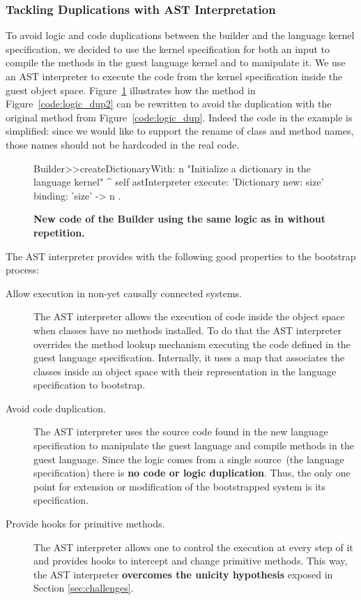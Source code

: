 \subsubsection{Tackling Duplications with AST Interpretation}\label{sec:ast_interpreter}

To avoid logic and code duplications between the builder and the language kernel specification, we decided to use the kernel specification for both an input to compile the methods in the guest language kernel and to manipulate it. We use an AST interpreter to execute the code from the kernel specification inside the guest object space. Figure~\ref{code:logic_dup3} illustrates how the method in Figure~\ref{code:logic_dup2} can be rewritten to avoid the duplication with the original  method from Figure~\ref{code:logic_dup}. Indeed the code in the example is simplified: since we would like to support the rename of class and method names, those names should not be hardcoded in the real code.

\begin{figure}[ht]
\begin{code}
Builder>>createDictionaryWith: n
    "Initialize a dictionary in the language kernel"
    ^ self astInterpreter
            execute: 'Dictionary new: size'
            binding: { 'size' -> n }.
\end{code}
\caption{\textbf{New code of the Builder using the same logic as in  without repetition.}\label{code:logic_dup3}}
\end{figure}

The AST interpreter provides with the following good properties to the bootstrap process:

\begin{description}

\item[Allow execution in non-yet causally connected systems.] The AST interpreter allows the execution of code inside the object space when classes have no methods installed. To do that the AST interpreter overrides the method lookup mechanism executing the code defined in the guest language specification. Internally, it uses a map that associates the classes inside an object space with their representation in the language specification to bootstrap.

\item[Avoid code duplication.] The AST interpreter uses the source code found in the new language specification to manipulate the guest language and compile methods in the guest language. Since the logic comes from a single source~(the language specification) there is \textbf{no code or logic duplication}. Thus, the only one point for extension or modification of the bootstrapped system is its specification.

\item[Provide hooks for primitive methods.] The AST interpreter allows one to control the execution at every step of it and provides hooks to intercept and change primitive methods. This way, the AST interpreter \textbf{overcomes the unicity hypothesis} exposed in Section \ref{sec:challenges}. 

\end{description}

